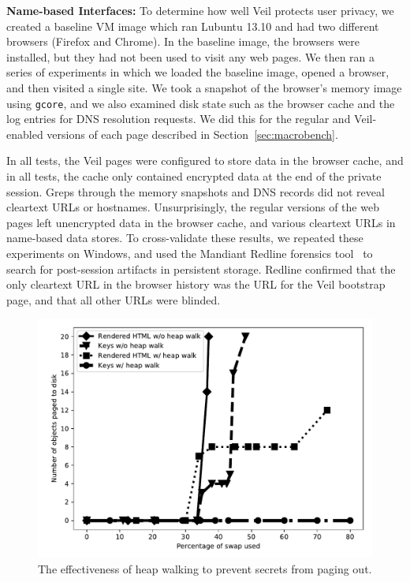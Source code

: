 \noindent
{\bf Name-based Interfaces:} To determine
how well Veil protects user privacy, we created
a baseline VM image which ran Lubuntu 13.10 and
had two different browsers (Firefox and Chrome). In
the baseline image, the browsers were installed, but they had
not been used to visit any web pages. We then ran
a series of experiments in which we loaded the
baseline image, opened a browser, and then visited
a single site. We took a snapshot of the browser's
memory image using \texttt{gcore}, and we also
examined disk state such as the browser
cache and the log entries for DNS resolution
requests. We did this for the regular and
Veil-enabled versions of each page described in
Section~\ref{sec:macrobench}.

In all tests, the Veil pages were configured to
store data in the browser cache, and in all tests,
the cache only contained encrypted data at the
end of the private session. Greps through the
memory snapshots and DNS records did not reveal
cleartext URLs or hostnames. Unsurprisingly,
the regular versions of the web pages left
unencrypted data in the browser cache, and
various cleartext URLs in name-based data
stores. To cross-validate these results, we
repeated these experiments on Windows, and used
the Mandiant Redline forensics tool~\cite{mandiant}
to search for post-session artifacts in persistent
storage. Redline confirmed that the only
cleartext URL in the browser history was the
URL for the Veil bootstrap page, and that all
other URLs were blinded.

\begin{figure}
	\centering
	\includegraphics[width=\textwidth]{veil-figs/heapwalk_graph.pdf}
	\caption{The effectiveness of heap walking to prevent secrets from paging out.}
	\label{fig:heapWalking}
\end{figure}

